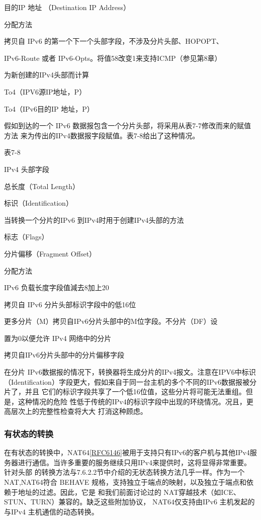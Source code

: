 目的IP 地址 （Destination IP Address）

分配方法

拷贝自 IPv6 的第一个下一个头部字段，不涉及分片头部、HOPOPT、

IPv6-Route 或者 IPv6-Opts。将值58改变1来支持ICMP（参见第8章）

为新创建的IPv4头部而计算

To4（IPV6源IP地址，P）

To4（IPv6目的IP 地址，P）

假如到达的一个 IPv6 数据报包含一个分片头部，将采用从表7-7修改而来的赋值方法
来为传出的IPv4数据报字段赋值。表7-8给出了这种情况。

表7-8

IPv4 头部字段

总长度（Total Length）

标识（Identification）

当转换一个分片的IPv6 到IPv4时用于创建IPv4头部的方法

标志（Flags）

分片偏移（Fragment Offset）

分配方法

IPv6 负载长度字段值減去8加上20

拷贝自 IPv6 分片头部标识字段中的低16位

更多分片（M）拷贝自IPv6分片头部中的M位字段。不分片（DF）设

置为0以便允许 IPv4 网络中的分片

拷贝自IPv6分片头部中的分片偏移字段

在分片 IPv6数据报的情况下，转换器将生成分片的IPv4报文。注意在IPV6中标识
（Identification）字段更大，假如来自于同一台主机的多个不同的IPv6数据报被分片了，并且
它们的标识字段共享了一个低16位值，这些分片将可能无法重组。但是，这种情况的危险
性低于传统的IPv4的标识字段中出现的环绕情况。况且，更高层次上的完整性检查将大大
打消这种顾虑。

\subsubsection{有状态的转换}

在有状态的转换中，NAT64\href{https://www.rfc-editor.org/rfc/rfc6146}{[RFC6146]}被用于支持只有IPv6的客户机与其他IPv4服
务器进行通信。当许多重要的服务继续只用IPv4来提供时，这将显得非常重要。针对头部
的转换方法与7.6.2.2节中介绍的无状态转换方法几乎一样。作为一个 NAT,NAT64符合
BEHAVE 规格，支持独立于端点的映射，以及独立于端点和依赖于地址的过滤。因此，它是
和我们前面讨论过的 NAT穿越技术（如ICE、STUN、TURN）兼容的。缺乏这些附加协议，
NAT64仅支持由IPv6 主机发起的与IPv4 主机通信的动态转换。

